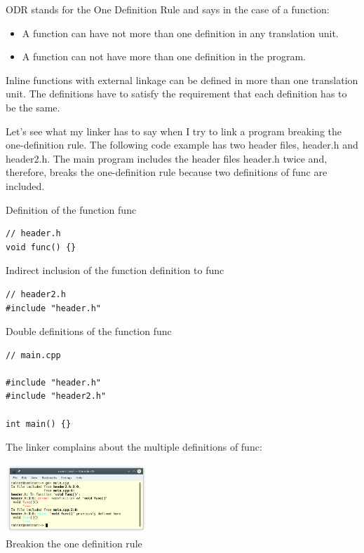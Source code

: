 ODR stands for the One Definition Rule and says in the case of a function:

\begin{itemize}
\item 
A function can have not more than one definition in any translation unit.

\item 
A function can not have more than one definition in the program.
\end{itemize}

Inline functions with external linkage can be defined in more than one translation unit. The definitions have to satisfy the requirement that each definition has to be the same.

Let’s see what my linker has to say when I try to link a program breaking the one-definition rule. The following code example has two header files, header.h and header2.h. The main program includes the header files header.h twice and, therefore, breaks the one-definition rule because two definitions of func are included.

\noindent
Definition of the function func
\begin{lstlisting}[style=styleCXX]
// header.h
void func() {}
\end{lstlisting}

\noindent
Indirect inclusion of the function definition to func
\begin{lstlisting}[style=styleCXX]
// header2.h
#include "header.h"
\end{lstlisting}

\noindent
Double definitions of the function func
\begin{lstlisting}[style=styleCXX]
// main.cpp

#include "header.h"
#include "header2.h"

int main() {}
\end{lstlisting}

The linker complains about the multiple definitions of func:

\begin{center}
\includegraphics[width=0.4\textwidth]{content/3/chapter4/images/16.png}\\
Breakion the one definition rule
\end{center}

